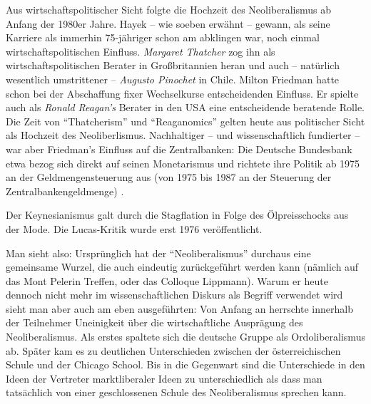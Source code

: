 Aus wirtschaftspolitischer Sicht folgte die Hochzeit des Neoliberalismus ab Anfang der 1980er Jahre. Hayek -- wie soeben erwähnt -- gewann, als seine Karriere als immerhin 75-jähriger schon am abklingen war, noch einmal wirtschaftspolitischen Einfluss. \textit{Margaret Thatcher} zog ihn als wirtschaftspolitischen Berater in Großbritannien heran und auch -- natürlich wesentlich umstrittener -- \textit{Augusto Pinochet} in Chile. Milton Friedman hatte schon bei der Abschaffung fixer Wechselkurse entscheidenden Einfluss. Er spielte auch als \textit{Ronald Reagan's} Berater in den USA eine entscheidende beratende Rolle. Die Zeit von "`Thatcherism"' und "`Reaganomics"'  gelten heute aus politischer Sicht als Hochzeit des Neoliberlismus. Nachhaltiger -- und wissenschaftlich fundierter -- war aber Friedman's Einfluss auf die Zentralbanken:  Die Deutsche Bundesbank etwa bezog sich direkt auf seinen Monetarismus und richtete ihre Politik ab 1975 an der Geldmengensteuerung aus (von 1975 bis 1987 an der Steuerung der Zentralbankengeldmenge) \parencite[S. 36]{BBK2016}. 




Der Keynesianismus galt durch die Stagflation in Folge des Ölpreisschocks aus der Mode. Die Lucas-Kritik wurde erst 1976 veröffentlicht.



Man sieht also: Ursprünglich hat der "`Neoliberalismus"' durchaus eine gemeinsame Wurzel, die auch eindeutig zurückgeführt werden kann (nämlich auf das Mont Pelerin Treffen, oder das Colloque Lippmann). Warum er heute dennoch nicht mehr im wissenschaftlichen Diskurs als Begriff verwendet wird sieht man aber auch am eben ausgeführten: Von Anfang an herrschte innerhalb der Teilnehmer Uneinigkeit über die wirtschaftliche Ausprägung des Neoliberalismus. Als erstes spaltete sich die deutsche Gruppe als Ordoliberalismus ab. Später kam es zu deutlichen Unterschieden zwischen der österreichischen Schule und der Chicago School. Bis in die Gegenwart sind die Unterschiede in den Ideen der Vertreter marktliberaler Ideen zu unterschiedlich als dass man tatsächlich von einer geschlossenen Schule des Neoliberalismus sprechen kann.



